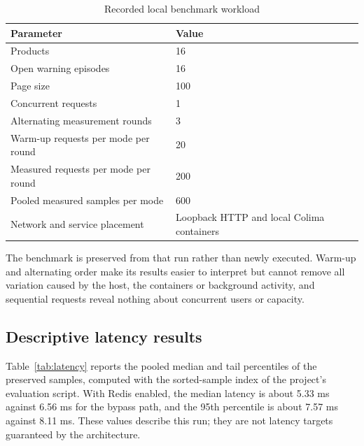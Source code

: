 \begin{table}[htbp]\centering\small{}\setlength{\tabcolsep}{3pt}\renewcommand{\arraystretch}{1.25}
\caption{Recorded local benchmark workload}\label{tab:benchmark-workload}
\begin{tabular}{>{\raggedright\arraybackslash}p{}>{\raggedright\arraybackslash}p{}}
\toprule
\textbf{Parameter} & \textbf{Value} \\
\midrule
\leavevmode{}Products & \leavevmode{}16 \\
\leavevmode{}Open warning episodes & \leavevmode{}16 \\
\leavevmode{}Page size & \leavevmode{}100 \\
\leavevmode{}Concurrent requests & \leavevmode{}1 \\
\leavevmode{}Alternating measurement rounds & \leavevmode{}3 \\
\leavevmode{}Warm-up requests per mode per round & \leavevmode{}20 \\
\leavevmode{}Measured requests per mode per round & \leavevmode{}200 \\
\leavevmode{}Pooled measured samples per mode & \leavevmode{}600 \\
\leavevmode{}Network and service placement & \leavevmode{}Loopback HTTP and local Colima containers \\
\bottomrule\end{tabular}\end{table}

The benchmark is preserved from that run rather than newly executed. Warm-up and alternating order make its results easier to interpret but cannot remove all variation caused by the host, the containers or background activity, and sequential requests reveal nothing about concurrent users or capacity.


\subsection{Descriptive latency results}

Table~\ref{tab:latency} reports the pooled median and tail percentiles of the preserved samples, computed with the sorted-sample index of the project's evaluation script. With Redis enabled, the median latency is about 5.33 ms against 6.56 ms for the bypass path, and the 95th percentile is about 7.57 ms against 8.11 ms. These values describe this run; they are not latency targets guaranteed by the architecture.


